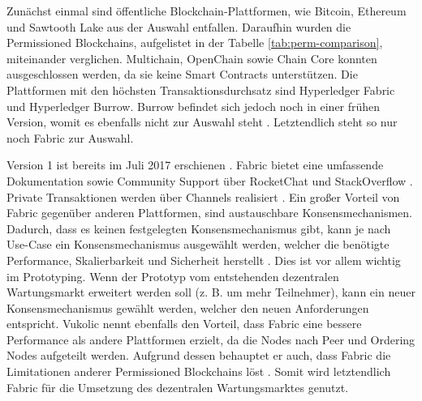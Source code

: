 Zunächst einmal sind öffentliche Blockchain-Plattformen, wie Bitcoin, Ethereum und Sawtooth Lake aus der Auswahl entfallen. Daraufhin wurden die Permissioned Blockchains, aufgelistet in der Tabelle \ref{tab:perm-comparison}, miteinander verglichen. Multichain, OpenChain sowie Chain Core konnten ausgeschlossen werden, da sie keine Smart Contracts unterstützen. Die Plattformen mit den höchsten Transaktionsdurchsatz sind Hyperledger Fabric und Hyperledger Burrow. Burrow befindet sich jedoch noch in einer frühen Version, womit es ebenfalls nicht zur Auswahl steht \cite{HyperledgerFabricTeamHyperledgerFabricReleases2018}. Letztendlich steht so nur noch Fabric zur Auswahl. 

Version 1 ist bereits im Juli 2017 erschienen \cite{HyperledgerFabricTeamHyperledgerFabricReleases2018}. Fabric bietet eine umfassende Dokumentation sowie Community Support über RocketChat und StackOverflow \cite{HyperledgerFabricTeamSupportHyperledgerFabric}. Private Transaktionen werden über Channels realisiert \cite{SchererPerformanceScalabilityBlockchain2017}. Ein großer Vorteil von Fabric gegenüber anderen Plattformen, sind austauschbare Konsensmechanismen. Dadurch, dass es keinen festgelegten Konsensmechanismus gibt, kann je nach Use-Case ein Konsensmechanismus ausgewählt werden, welcher die benötigte Performance, Skalierbarkeit und Sicherheit herstellt \cite{VukolicRethinkingPermissionedBlockchains2017}. Dies ist vor allem wichtig im Prototyping. Wenn der Prototyp vom entstehenden dezentralen Wartungsmarkt erweitert werden soll (z. B. um mehr Teilnehmer), kann ein neuer Konsensmechanismus gewählt werden, welcher den neuen Anforderungen entspricht. Vukolic nennt ebenfalls den Vorteil, dass Fabric eine bessere Performance als andere Plattformen erzielt, da die Nodes nach Peer und Ordering Nodes aufgeteilt werden. Aufgrund dessen behauptet er auch, dass Fabric die Limitationen anderer Permissioned Blockchains löst \cite{VukolicRethinkingPermissionedBlockchains2017}. Somit wird letztendlich Fabric für die Umsetzung des dezentralen Wartungsmarktes genutzt.

